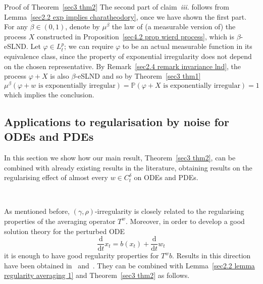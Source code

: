 \documentclass[10pt]{article}
\newcommand{\mathd}{\mathrm{d}}
\newcommand{\tmtextit}[1]{{\itshape{#1}}}
\newenvironment{proof*}[1]{\noindent\textbf{#1\ }}{\hspace*{\fill}$\Box$\medskip}
\begin{document}
\begin{proof*}{Proof of Theorem~\ref{sec3 thm2}}
  The second part of claim~\tmtextit{iii.} follows from Lemma~\ref{sec2.2 exp
  implies charatheodory}, once we have shown the first part. For any $\beta
  \in (0, 1)$, denote by $\mu^{\beta}$ the law of (a measurable version of)
  the process $X$ constructed in Proposition~\ref{sec4.2 prop wierd process},
  which is $\beta$\mbox{-}eSLND. Let $\varphi \in L^p_t$; we can require
  $\varphi$ to be an actual measurable function in its equivalence class,
  since the property of exponential irregularity does not depend on the chosen
  representative. By Remark~\ref{sec2.4 remark invariance lnd}, the process
  $\varphi + X$ is also $\beta$\mbox{-}eSLND and so by Theorem~\ref{sec3 thm1}
  \[ \mu^{\beta} \left( \varphi + w \text{ is exponentially irregular} \right)
     =\mathbb{P} \left( \varphi + X \text{ is exponentially irregular} \right)
     = 1 \]
  which implies the conclusion.
\end{proof*}

\subsection{Applications to regularisation by noise for ODEs and
PDEs}\label{sec3.2}

In this section we show how our main result, Theorem~\ref{sec3 thm2}, can be
combined with already existing results in the literature, obtaining results on
the regularising effect of almost every $w \in C^{\delta}_t$ on ODEs and PDEs.

\

As mentioned before, $(\gamma, \rho)$\mbox{-}irregularity is closely related
to the regularising properties of the averaging operator $T^w$. Moreover, in
order to develop a good solution theory for the perturbed ODE
\begin{equation}
  \frac{\mathd}{\mathd t} x_t = b (x_t) + \frac{\mathd}{\mathd t} w_t
  \label{sec6 ode}
\end{equation}
it is enough to have good regularity properties for $T^w b$. Results in this
direction have been obtained in~{\cite{catelliergubinelli}}
and~{\cite{galeatigubinelli_ode}}. They can be combined with Lemma~\ref{sec2.2
lemma regularity averaging 1} and Theorem~\ref{sec3 thm2} as follows.
\end{document}
